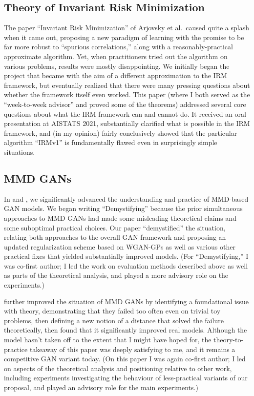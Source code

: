 \documentclass[12pt]{article}
\begin{document}
\subsection{Theory of Invariant Risk Minimization}
The paper ``Invariant Risk Minimization'' of Arjovsky et al.\ caused quite a splash when it came out, proposing a new paradigm of learning with the promise to be far more robust to ``spurious correlations,'' along with a reasonably-practical approximate algorithm. Yet, when practitioners tried out the algorithm on various problems, results were mostly disappointing. We initially began the project that became \cite{kamath:irm} with the aim of a different approximation to the IRM framework, but eventually realized that there were many pressing questions about whether the framework itself even worked. This paper (where I both served as the ``week-to-week advisor'' and proved some of the theorems) addressed several core questions about what the IRM framework can and cannot do. It received an oral presentation at AISTATS 2021, substantially clarified what is possible in the IRM framework, and (in my opinion) fairly conclusively showed that the particular algorithm ``IRMv1'' is fundamentally flawed even in surprisingly simple situations.


\subsection{MMD GANs}

In \cite{binkowski:mmd-gans} and \cite{arbel:smmd}, we significantly advanced the understanding and practice of MMD-based GAN models. We began writing ``Demystifying'' because the prior simultaneous approaches to MMD GANs had made some misleading theoretical claims and some suboptimal practical choices. Our paper ``demystified'' the situation, relating both approaches to the overall GAN framework and proposing an updated regularization scheme based on WGAN-GPs as well as various other practical fixes that yielded substantially improved models.
(For ``Demystifying,'' I was co-first author; I led the work on evaluation methods described above as well as parts of the theoretical analysis, and played a more advisory role on the experiments.)

\cite{arbel:smmd} further improved the situation of MMD GANs by identifying a foundational issue with theory, demonstrating that they failed too often even on trivial toy problems, then defining a new notion of a distance that solved the failure theoretically, then found that it significantly improved real models. Although the model hasn't taken off to the extent that I might have hoped for, the theory-to-practice takeaway of this paper was deeply satisfying to me, and it remains a competitive GAN variant today. (On this paper I was again co-first author; I led on aspects of the theoretical analysis and positioning relative to other work, including experiments investigating the behaviour of less-practical variants of our proposal, and played an advisory role for the main experiments.)
\end{document}
